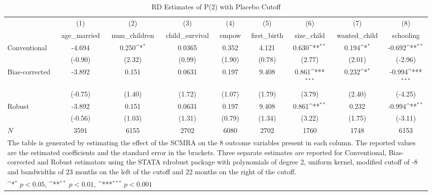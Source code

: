 \begin{table}[htbp]\centering
\def\sym#1{\ifmmode^{#1}\else\(^{#1}\)\fi}
\caption{RD Estimates of P(2) with Placebo Cutoff}
\begin{tabular}{l*{8}{c}}
\toprule
            &\multicolumn{1}{c}{(1)}&\multicolumn{1}{c}{(2)}&\multicolumn{1}{c}{(3)}&\multicolumn{1}{c}{(4)}&\multicolumn{1}{c}{(5)}&\multicolumn{1}{c}{(6)}&\multicolumn{1}{c}{(7)}&\multicolumn{1}{c}{(8)}\\
            &\multicolumn{1}{c}{age\_married}&\multicolumn{1}{c}{num\_children}&\multicolumn{1}{c}{child\_survival}&\multicolumn{1}{c}{empow}&\multicolumn{1}{c}{first\_birth}&\multicolumn{1}{c}{size\_child}&\multicolumn{1}{c}{wanted\_child}&\multicolumn{1}{c}{schooling}\\
\midrule
Conventional&      -4.694         &       0.250\sym{*}  &      0.0365         &       0.352         &       4.121         &       0.630\sym{**} &       0.194\sym{*}  &      -0.692\sym{**} \\
            &     (-0.90)         &      (2.32)         &      (0.99)         &      (1.90)         &      (0.78)         &      (2.77)         &      (2.01)         &     (-2.96)         \\
\addlinespace
Bias-corrected&      -3.892         &       0.151         &      0.0631         &       0.197         &       9.408         &       0.861\sym{***}&       0.232\sym{*}  &      -0.994\sym{***}\\
            &     (-0.75)         &      (1.40)         &      (1.72)         &      (1.07)         &      (1.79)         &      (3.79)         &      (2.40)         &     (-4.25)         \\
\addlinespace
Robust      &      -3.892         &       0.151         &      0.0631         &       0.197         &       9.408         &       0.861\sym{**} &       0.232         &      -0.994\sym{**} \\
            &     (-0.56)         &      (1.03)         &      (1.31)         &      (0.79)         &      (1.34)         &      (3.22)         &      (1.75)         &     (-3.11)         \\
\midrule
\(N\)       &        3591         &        6155         &        2702         &        6080         &        2702         &        1760         &        1748         &        6153         \\
\bottomrule
\multicolumn{9}{l}{\footnotesize The table is generated by estimating the effect of the SCMRA on the 8 outcome variables present in each column. The reported values are the estimated coefficients and the standard error in the brackets. Three separate estimates are reported for Conventional, Bias-corrected and Robust estimators using the STATA rdrobust package with polynomials of degree 2, uniform kernel, modified cutoff of -8 and bandwidths of 23 months on the left of the cutoff and 22 months on the right of the cutoff.}\\
\multicolumn{9}{l}{\footnotesize \sym{*} \(p<0.05\), \sym{**} \(p<0.01\), \sym{***} \(p<0.001\)}\\
\end{tabular}
\end{table}
